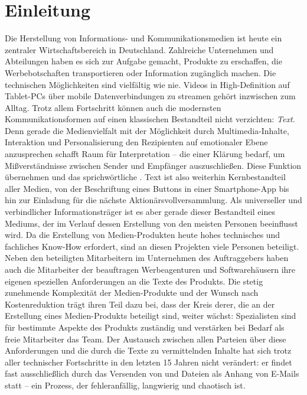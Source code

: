 \section{Einleitung}

Die Herstellung von Informations- und Kommunikationsmedien ist heute ein zentraler Wirtschaftsbereich in Deutschland. Zahlreiche Unternehmen und Abteilungen haben es sich zur Aufgabe gemacht, Produkte zu erschaffen, die Werbebotschaften transportieren oder Information zugänglich machen. Die technischen Möglichkeiten sind vielfältig wie nie. Videos in High-Definition auf Tablet-PCs über mobile Datenverbindungen zu streamen gehört inzwischen zum Alltag. Trotz allem Fortschritt können auch die modernsten Kommunikationsformen auf einen klassischen Bestandteil nicht verzichten: \emph{Text}. Denn gerade die Medienvielfalt mit der Möglichkeit durch Multimedia-Inhalte, Interaktion und Personalisierung den Rezipienten auf emotionaler Ebene anzusprechen schafft Raum für Interpretation -- die einer Klärung bedarf, um Mißverständnisse zwischen Sender und Empfänger auszuschließen. Diese Funktion übernehmen  und das sprichwörtliche . Text ist also weiterhin Kernbestandteil aller Medien, von der Beschriftung eines Buttons in einer Smartphone-App bis hin zur Einladung für die nächste Aktionärsvollversammlung. Als universeller und verbindlicher Informationsträger ist es aber gerade dieser Bestandteil eines Mediums, der im Verlauf dessen Erstellung von den meisten Personen beeinflusst wird. Da die Erstellung von Medien-Produkten heute hohes technisches und fachliches Know-How erfordert, sind an diesen Projekten viele Personen beteiligt. Neben den beteiligten Mitarbeitern im Unternehmen des Auftraggebers haben auch die Mitarbeiter der beauftragen Werbeagenturen und Softwarehäusern ihre eigenen speziellen Anforderungen an die Texte des Produkts. Die stetig zunehmende Komplexität der Medien-Produkte und der Wunsch nach Kostenreduktion trägt ihren Teil dazu bei, dass der Kreis derer, die an der Erstellung eines Medien-Produkts beteiligt sind, weiter wächst: Spezialisten sind für bestimmte Aspekte des Produkts zuständig und verstärken bei Bedarf als freie Mitarbeiter das Team. Der Austausch zwischen allen Parteien über diese Anforderungen und die durch die Texte zu vermittelnden Inhalte hat sich trotz aller technischer Fortschritte in den letzten 15 Jahren nicht verändert: er findet fast ausschließlich durch das Versenden von  und Dateien als Anhang von E-Mails statt -- ein Prozess, der fehleranfällig, langwierig und chaotisch ist. 

